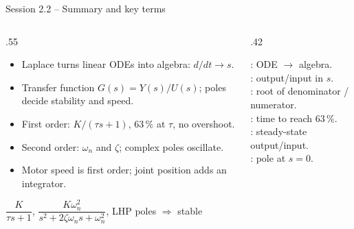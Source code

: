 \documentclass[aspectratio=169,10pt]{beamer}
\begin{document}
\begin{frame}{Session 2.2 -- Summary and key terms}
\begin{columns}[T]
\begin{column}{.55\textwidth}
\small
\begin{itemize}
\item Laplace turns linear ODEs into algebra: $d/dt\rightarrow s$.
\item Transfer function $G(s)=Y(s)/U(s)$; poles decide stability and speed.
\item First order: $K/(\tau s+1)$, 63\,\% at $\tau$, no overshoot.
\item Second order: $\omega_n$ and $\zeta$; complex poles oscillate.
\item Motor speed is first order; joint position adds an integrator.
\end{itemize}
\begin{keybox}[Remember]
$\dfrac{K}{\tau s+1}$, \quad $\dfrac{K\omega_n^2}{s^2+2\zeta\omega_ns+\omega_n^2}$, \quad LHP poles $\Rightarrow$ stable
\end{keybox}
\end{column}
\begin{column}{.42\textwidth}
\begin{defbox}
\small
{}: ODE $\rightarrow$ algebra.\\
: output/input in $s$.\\
: root of denominator / numerator.\\
: time to reach 63\,\%.\\
: steady-state output/input.\\
: pole at $s=0$.
\end{defbox}
\end{column}
\end{columns}
\end{frame}

\end{document}
